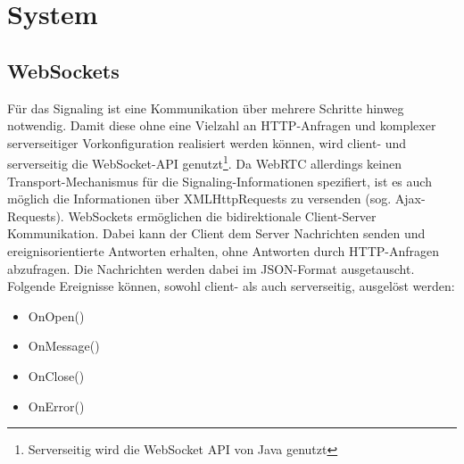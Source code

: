 
\section{System}
\label{sec:system}
%

\subsection{WebSockets}
\label{subsec:websockets}
Für das Signaling ist eine Kommunikation über mehrere Schritte hinweg notwendig.
Damit diese ohne eine Vielzahl an HTTP-Anfragen und komplexer serverseitiger Vorkonfiguration realisiert werden können, wird client- und serverseitig
die WebSocket-API\parencite{WebSocketSpec} genutzt\footnote{Serverseitig wird die WebSocket API von Java genutzt\parencite{JavaEEWebSocket}}.
Da WebRTC allerdings keinen Transport-Mechanismus für die Signaling-Informationen spezifiert, ist es auch möglich die Informationen über
XMLHttpRequests zu versenden (sog. Ajax-Requests).
WebSockets ermöglichen die bidirektionale Client-Server Kommunikation.
Dabei kann der Client dem Server Nachrichten senden und ereignisorientierte Antworten erhalten,
ohne Antworten durch HTTP-Anfragen abzufragen\parencite{WebSocketMDN}.
Die Nachrichten werden dabei im JSON-Format ausgetauscht.
Folgende Ereignisse können, sowohl client- als auch serverseitig, ausgelöst werden:
\begin{itemize}
    \item OnOpen()
    \item OnMessage()
    \item OnClose()
    \item OnError()
\end{itemize}

